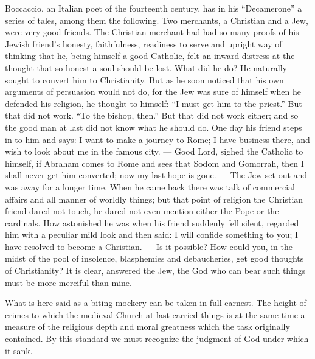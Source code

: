 \documentclass[12pt,a4paper,openany]{book}
\newcommand{\opage}[1]{\marginnote{\footnotesize\textit{[#1]}}}
\begin{document}
Boccaccio, an Italian poet of the fourteenth century,
has in his ``Decamerone'' a series of tales,
among them the following. Two merchants, a
Christian and a Jew, were very good friends. The
Christian merchant had had so many proofs of his
Jewish friend's honesty, faithfulness, readiness to serve and
upright way of thinking that he, being himself a good
Catholic, felt an inward distress at the thought that
so honest a soul should be lost. What
did he do? He naturally sought to convert him
to Christianity. But as he soon noticed
that his own arguments of persuasion would not do,
\setcounter{footnote}{0}%
\opage{92}for the Jew was sure of himself when he defended his religion,
he thought to himself: ``I must get him to the priest.''
But that did not work. ``To the bishop, then.'' But that
did not work either; and so the good man at last did not
know what he should do. One day his
friend steps in to him and says: I want to make a journey to
Rome; I have business there, and wish to look
about me in the famous city. --- Good Lord, sighed the Catholic
to himself, if Abraham comes to Rome and sees
that Sodom and Gomorrah, then I shall never get him
converted; now my last hope is gone. --- The Jew set out
and was away for a longer time. When he came back there
was talk of commercial affairs and all manner of worldly
things; but that point of religion the Christian
friend dared not touch, he dared not even mention either the Pope
or the cardinals. How astonished he was when
his friend suddenly fell silent, regarded him with a peculiar
mild look and then said: I will confide something to you;
I have resolved to become a Christian. --- Is it possible?
How could you, in the midst of the pool of insolence, blasphemies
and debaucheries, get good thoughts of Christianity? It is clear, answered the Jew, the God who
can bear such things must be more merciful than mine.

What is here said as a biting mockery can be taken
in full earnest. The height of crimes to which
the medieval Church at last carried things is
at the same time a measure of the religious depth and moral
greatness which the task originally contained. By
this standard we must recognize the judgment of God under which
it sank.
\end{document}
